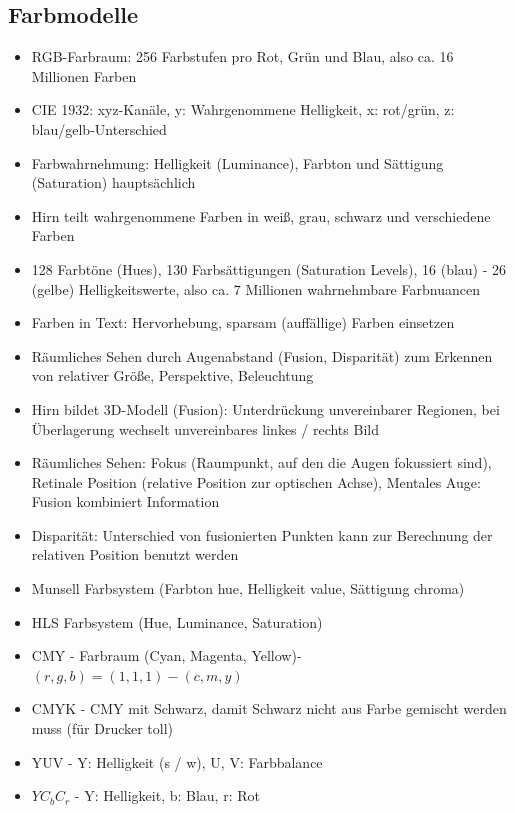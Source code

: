 \documentclass[12pt,landscape]{article}
\begin{document}
\begin{multicols}{3}
\subsection{Farbmodelle}
\begin{itemize}
\item RGB-Farbraum: 256 Farbstufen pro Rot, Grün und Blau, also ca. 16 Millionen Farben
\item CIE 1932: xyz-Kanäle, y: Wahrgenommene Helligkeit, x: rot/grün, z: blau/gelb-Unterschied
\item Farbwahrnehmung: Helligkeit (Luminance), Farbton und Sättigung (Saturation) hauptsächlich
\item Hirn teilt wahrgenommene Farben in weiß, grau, schwarz und verschiedene Farben
\item 128 Farbtöne (Hues), 130 Farbsättigungen (Saturation Levels), 16 (blau) - 26 (gelbe) Helligkeitswerte, also ca. 7 Millionen wahrnehmbare Farbnuancen
\item Farben in Text: Hervorhebung, sparsam (auffällige) Farben einsetzen
\item Räumliches Sehen durch Augenabstand (Fusion, Disparität) zum Erkennen von relativer Größe, Perspektive, Beleuchtung
\item Hirn bildet 3D-Modell (Fusion): Unterdrückung unvereinbarer Regionen, bei Überlagerung wechselt unvereinbares linkes / rechts Bild
\item Räumliches Sehen: Fokus (Raumpunkt, auf den die Augen fokussiert sind), Retinale Position (relative Position zur optischen Achse), Mentales Auge: Fusion kombiniert Information
\item Disparität: Unterschied von fusionierten Punkten kann zur Berechnung der relativen Position benutzt werden
\item Munsell Farbsystem (Farbton hue, Helligkeit value, Sättigung chroma)
\item HLS Farbsystem (Hue, Luminance, Saturation)
\item CMY - Farbraum (Cyan, Magenta, Yellow)- $(r, g, b) = (1, 1, 1) - (c, m, y)$
\item CMYK - CMY mit Schwarz, damit Schwarz nicht aus Farbe gemischt werden muss (für Drucker toll)
\item YUV - Y: Helligkeit (s / w), U, V: Farbbalance
\item $YC_bC_r$ - Y: Helligkeit, b: Blau, r: Rot
\end{itemize}

\end{multicols}
\end{document}
